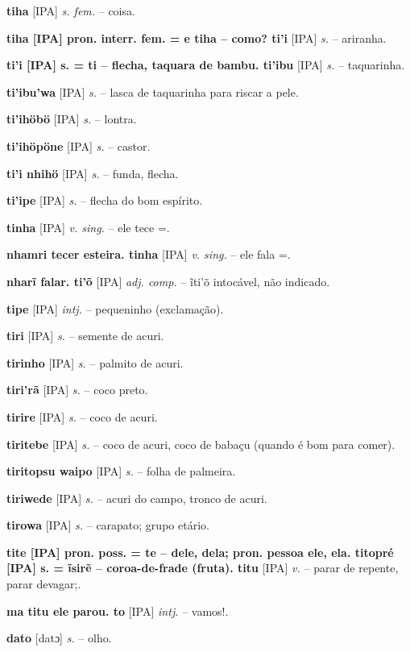 \textbf{tiha} [IPA] \textit{s. fem.} -- coisa.

\textbf{tiha [IPA] pron. interr. fem. = e tiha -- como? ti'i} [IPA] \textit{s.} -- ariranha.

\textbf{ti'i [IPA] s. = ti -- flecha, taquara de bambu. ti'ibu} [IPA] \textit{s.} -- taquarinha.

\textbf{ti'ibu'wa} [IPA] \textit{s.} -- lasca de taquarinha para riscar a pele.

\textbf{ti'ihöbö} [IPA] \textit{s.} -- lontra.

\textbf{ti'ihöpöne} [IPA] \textit{s.} -- castor.

\textbf{ti'i nhihö} [IPA] \textit{s.} -- funda, flecha.

\textbf{ti'ipe} [IPA] \textit{s.} -- flecha do bom espírito.

\textbf{tinha} [IPA] \textit{v. sing.} -- ele tece =.

\textbf{nhamri tecer esteira. tinha} [IPA] \textit{v. sing.} -- ele fala =.

\textbf{nharĩ falar. ti'õ} [IPA] \textit{adj. comp.} -- ĩti'õ intocável, não indicado.

\textbf{tipe} [IPA] \textit{intj.} -- pequeninho (exclamação).

\textbf{tiri} [IPA] \textit{s.} -- semente de acuri.

\textbf{tirinho} [IPA] \textit{s.} -- palmito de acuri.

\textbf{tiri'rã} [IPA] \textit{s.} -- coco preto.

\textbf{tirire} [IPA] \textit{s.} -- coco de acuri.

\textbf{tiritebe} [IPA] \textit{s.} -- coco de acuri, coco de babaçu (quando é bom para comer).

\textbf{tiritopsu waipo} [IPA] \textit{s.} -- folha de palmeira.

\textbf{tiriwede} [IPA] \textit{s.} -- acuri do campo, tronco de acuri.

\textbf{tirowa} [IPA] \textit{s.} -- carapato; grupo etário.

\textbf{tite [IPA] pron. poss. = te -- dele, dela; pron. pessoa ele, ela. titopré [IPA] s. = ĩsirẽ -- coroa-de-frade (fruta). titu} [IPA] \textit{v.} -- parar de repente, parar devagar;.

\textbf{ma titu ele parou. to} [IPA] \textit{intj.} -- vamos!.

\textbf{dato} [datɔ] \textit{s.} -- olho. \href{https://xavante.pythonanywhere.com/static/dicionario/play.html?file=eye.wav}{\faHeadphones}


